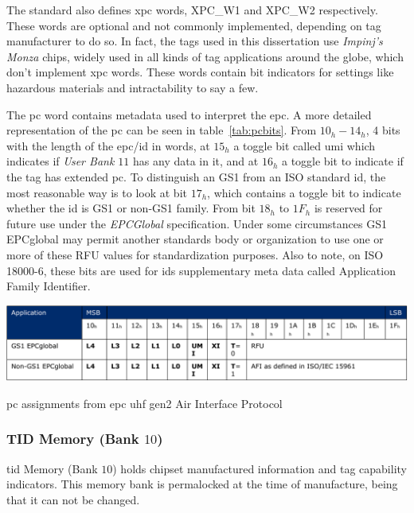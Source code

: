 The standard also defines \ac{xpc} words, XPC\_W1 and XPC\_W2 respectively. These words are optional and not commonly implemented, depending on tag manufacturer to do so. In fact, the tags used in this dissertation use \textit{Impinj's Monza} chips, widely used in all kinds of tag applications around the globe, which don't implement \ac{xpc} words. These words contain bit indicators for settings like hazardous materials and intractability to say a few.

The \ac{pc} word contains metadata used to interpret the \ac{epc}. A more detailed representation of the \ac{pc} can be seen in table~\ref{tab:pcbits}.
From $10_h-14_h$, 4 bits with the length of the \ac{epc}/\ac{id} in words, at $15_h$ a toggle bit called \ac{umi} which indicates if \emph{User Bank $11$} has any data in it, and at $16_h$ a toggle bit to indicate if the tag has extended \ac{pc}.
To distinguish an GS1 from an ISO standard \ac{id}, the most reasonable way is to look at bit $17_h$, which contains a toggle bit to indicate whether the \ac{id} is GS1 or non-GS1 family.
From bit $18_h$ to $1F_h$ is reserved for future use under the \emph{EPCGlobal} specification. Under some circumstances GS1 EPCglobal may permit another standards body or organization to use one or more of these RFU values for standardization purposes. Also to note, on ISO 18000-6, these bits are used for \acp{id} supplementary meta data called Application Family Identifier.

\begin{table}
    \centering
    \includegraphics[width=\textwidth]{./figs/02-state-of-the-art/table_pcbits.pdf}
    \caption{\ac{pc} assignments from \ac{epc} \ac{uhf} \ac{gen2} Air Interface Protocol~\cite{Gs1epcgen2v2uhfairinterfaceI2120180904}} 
    \label{tab:pcbits}
\end{table}

\subsubsection{TID Memory (Bank $10$)}

\ac{tid} Memory (Bank $10$) holds chipset manufactured information and tag capability indicators. This memory bank is permalocked at the time of manufacture, being that it can not be changed.

